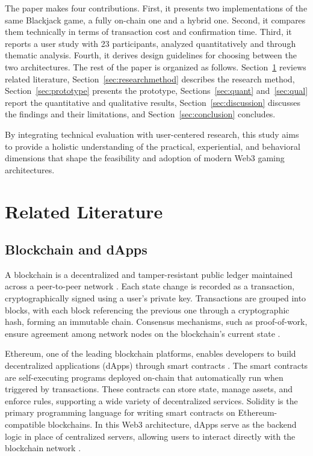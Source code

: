 \documentclass[10pt,conference]{IEEEtran}
\begin{document}
The paper makes four contributions. First, it presents two implementations of the same Blackjack game, a fully on-chain one and a hybrid one. Second, it compares them technically in terms of transaction cost and confirmation time. Third, it reports a user study with 23 participants, analyzed quantitatively and through thematic analysis. Fourth, it derives design guidelines for choosing between the two architectures. The rest of the paper is organized as follows. Section~\ref{sec:theory} reviews related literature, Section~\ref{sec:researchmethod} describes the research method, Section~\ref{sec:prototype} presents the prototype, Sections~\ref{sec:quant} and~\ref{sec:qual} report the quantitative and qualitative results, Section~\ref{sec:discussion} discusses the findings and their limitations, and Section~\ref{sec:conclusion} concludes.

By integrating technical evaluation with user-centered research, this study aims to provide a holistic understanding of the practical, experiential, and behavioral dimensions that shape the feasibility and adoption of modern Web3 gaming architectures.

\section{Related Literature} \label{sec:theory}

\subsection{Blockchain and dApps}
A blockchain is a decentralized and tamper-resistant public ledger maintained across a peer-to-peer network \cite{Nakamoto2008}. Each state change is recorded as a transaction, cryptographically signed using a user’s private key. Transactions are grouped into blocks, with each block referencing the previous one through a cryptographic hash, forming an immutable chain. Consensus mechanisms, such as proof-of-work, ensure agreement among network nodes on the blockchain’s current state \cite{Xu2023}. 

Ethereum, one of the leading blockchain platforms, enables developers to build decentralized applications (dApps) through smart contracts \cite{Buterin2014,Palladino2019}. The smart contracts are self-executing programs deployed on-chain that automatically run when triggered by transactions. These contracts can store state, manage assets, and enforce rules, supporting a wide variety of decentralized services. Solidity is the primary programming language for writing smart contracts on Ethereum-compatible blockchains. In this Web3 architecture, dApps serve as the backend logic in place of centralized servers, allowing users to interact directly with the blockchain network \cite{Ray2023}.
\end{document}
